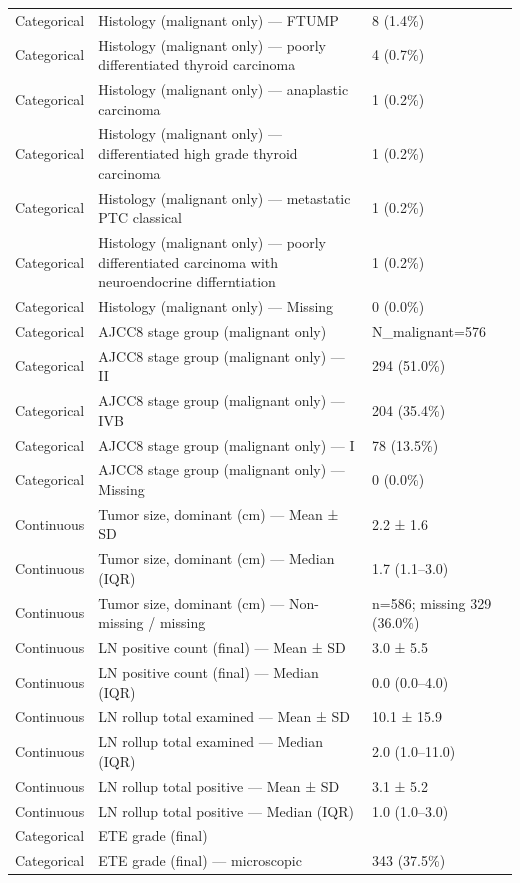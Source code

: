 \begin{table}[htbp]
\begin{tabular}{lll}
Categorical & Histology (malignant only) — FTUMP & 8 (1.4\%) \\
Categorical & Histology (malignant only) — poorly differentiated thyroid carcinoma & 4 (0.7\%) \\
Categorical & Histology (malignant only) — anaplastic carcinoma & 1 (0.2\%) \\
Categorical & Histology (malignant only) — differentiated high grade thyroid carcinoma & 1 (0.2\%) \\
Categorical & Histology (malignant only) — metastatic PTC classical & 1 (0.2\%) \\
Categorical & Histology (malignant only) — poorly differentiated carcinoma with neuroendocrine differntiation & 1 (0.2\%) \\
Categorical & Histology (malignant only) — Missing & 0 (0.0\%) \\
Categorical & AJCC8 stage group (malignant only) & N\_malignant=576 \\
Categorical & AJCC8 stage group (malignant only) — II & 294 (51.0\%) \\
Categorical & AJCC8 stage group (malignant only) — IVB & 204 (35.4\%) \\
Categorical & AJCC8 stage group (malignant only) — I & 78 (13.5\%) \\
Categorical & AJCC8 stage group (malignant only) — Missing & 0 (0.0\%) \\
Continuous & Tumor size, dominant (cm) — Mean ± SD & 2.2 ± 1.6 \\
Continuous & Tumor size, dominant (cm) — Median (IQR) & 1.7 (1.1–3.0) \\
Continuous & Tumor size, dominant (cm) — Non-missing / missing & n=586; missing 329 (36.0\%) \\
Continuous & LN positive count (final) — Mean ± SD & 3.0 ± 5.5 \\
Continuous & LN positive count (final) — Median (IQR) & 0.0 (0.0–4.0) \\
Continuous & LN rollup total examined — Mean ± SD & 10.1 ± 15.9 \\
Continuous & LN rollup total examined — Median (IQR) & 2.0 (1.0–11.0) \\
Continuous & LN rollup total positive — Mean ± SD & 3.1 ± 5.2 \\
Continuous & LN rollup total positive — Median (IQR) & 1.0 (1.0–3.0) \\
Categorical & ETE grade (final) &  \\
Categorical & ETE grade (final) — microscopic & 343 (37.5\%) \\

\end{tabular}
\end{table}
